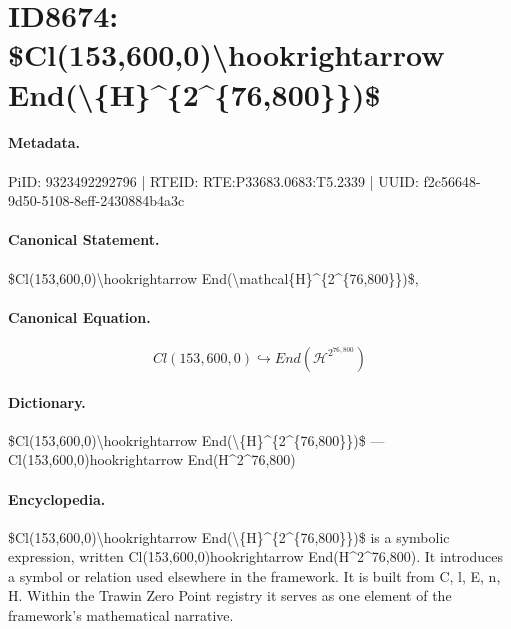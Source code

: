 \section*{ID8674: \$Cl(153,600,0)\textbackslash{}hookrightarrow End(\textbackslash{}\{H\}\textasciicircum{}\{2\textasciicircum{}\{76,800\}\})\$}
\paragraph{Metadata.}
PiID: 9323492292796 | RTEID: RTE:P33683.0683:T5.2339 | UUID: f2c56648-9d50-5108-8eff-2430884b4a3c

\paragraph{Canonical Statement.}
\$Cl(153,600,0)\textbackslash{}hookrightarrow End(\textbackslash{}mathcal\{H\}\textasciicircum{}\{2\textasciicircum{}\{76,800\}\})\$,

\paragraph{Canonical Equation.}
\[
Cl(153,600,0)\hookrightarrow End(\mathcal{H}^{2^{76,800}})
\]

\paragraph{Dictionary.}
\$Cl(153,600,0)\textbackslash{}hookrightarrow End(\textbackslash{}\{H\}\textasciicircum{}\{2\textasciicircum{}\{76,800\}\})\$ — Cl(153,600,0)hookrightarrow End(H\textasciicircum{}2\textasciicircum{}76,800)

\paragraph{Encyclopedia.}
\$Cl(153,600,0)\textbackslash{}hookrightarrow End(\textbackslash{}\{H\}\textasciicircum{}\{2\textasciicircum{}\{76,800\}\})\$ is a symbolic expression, written Cl(153,600,0)hookrightarrow End(H\textasciicircum{}2\textasciicircum{}76,800). It introduces a symbol or relation used elsewhere in the framework. It is built from C, l, E, n, H. Within the Trawin Zero Point registry it serves as one element of the framework's mathematical narrative.
